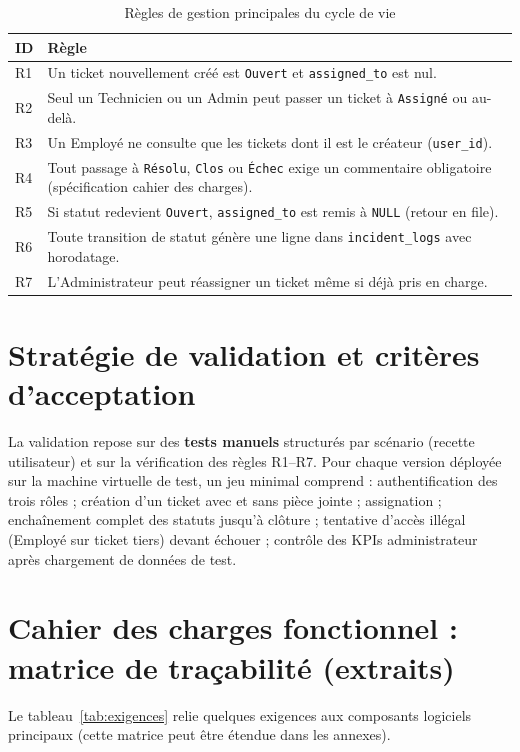 \begin{table}[H]
\centering
\small
\begin{tabular}{@{}p{1cm}p{13cm}@{}}
\toprule
\textbf{ID} & \textbf{Règle} \\
\midrule
R1 & Un ticket nouvellement créé est \texttt{Ouvert} et \texttt{assigned\_to} est nul. \\
R2 & Seul un Technicien ou un Admin peut passer un ticket à \texttt{Assigné} ou au-delà. \\
R3 & Un Employé ne consulte que les tickets dont il est le créateur (\texttt{user\_id}). \\
R4 & Tout passage à \texttt{Résolu}, \texttt{Clos} ou \texttt{Échec} exige un commentaire
obligatoire (spécification cahier des charges). \\
R5 & Si statut redevient \texttt{Ouvert}, \texttt{assigned\_to} est remis à \texttt{NULL}
(retour en file). \\
R6 & Toute transition de statut génère une ligne dans \texttt{incident\_logs} avec horodatage. \\
R7 & L'Administrateur peut réassigner un ticket même si déjà pris en charge. \\
\bottomrule
\end{tabular}
\caption{Règles de gestion principales du cycle de vie}
\label{tab:regles}
\end{table}

\section{Stratégie de validation et critères d'acceptation}
La validation repose sur des \textbf{tests manuels} structurés par scénario (recette utilisateur)
et sur la vérification des règles R1--R7. Pour chaque version déployée sur la machine virtuelle de
test, un jeu minimal comprend : authentification des trois rôles ; création d'un ticket avec et
sans pièce jointe ; assignation ; enchaînement complet des statuts jusqu'à clôture ; tentative
d'accès illégal (Employé sur ticket tiers) devant échouer ; contrôle des KPIs administrateur après
chargement de données de test.

\section{Cahier des charges fonctionnel : matrice de traçabilité (extraits)}
Le tableau~\ref{tab:exigences} relie quelques exigences aux composants logiciels principaux
(cette matrice peut être étendue dans les annexes).

